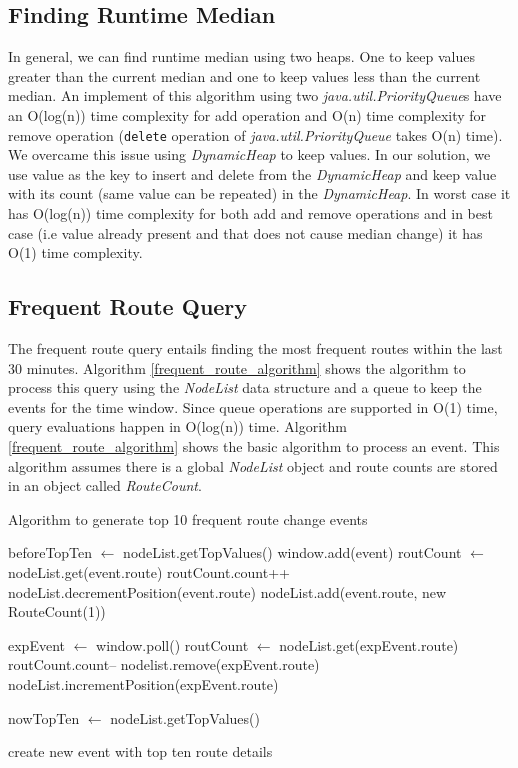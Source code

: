 \subsection{Finding Runtime Median}
In general, we can find runtime median using two heaps. One to keep values greater than the current median and one to keep values less than the current median. An implement of this algorithm using two \textit{java.util.PriorityQueue}s have an O(log(n)) time complexity for add operation and O(n) time complexity for remove operation (\texttt{delete} operation of \textit{java.util.PriorityQueue} takes O(n) time).  We overcame this issue using \textit{DynamicHeap} to keep values. In our solution, we use value as the key to insert and delete from the \textit{DynamicHeap} and keep value with its count (same value can be repeated) in the \textit{DynamicHeap}. In worst case it has O(log(n)) time complexity for both add and remove operations and in best case (i.e value already present and that does not cause median change) it has O(1) time complexity.

\subsection{Frequent Route Query}

The frequent route query entails finding the most frequent routes within the last 30 minutes. Algorithm \ref{frequent_route_algorithm} shows the algorithm to process this query using the \textit{NodeList} data structure and a queue to keep the events for the time window.  Since queue operations are supported in O(1) time, query evaluations happen in O(log(n)) time. Algorithm \ref{frequent_route_algorithm} shows the basic algorithm to process an event. This algorithm assumes there is a global \textit{NodeList} object and route counts are stored in an object called \textit{RouteCount}. 

\begin{algorithm}
\caption{Algorithm to generate top 10 frequent route change events}
\label{frequent_route_algorithm}
\begin{algorithmic}
\small 
\STATE beforeTopTen $\leftarrow$ nodeList.getTopValues() 
\STATE window.add(event) 
	\STATE routCount $\leftarrow$ nodeList.get(event.route) 
	\STATE routCount.count++ 
	\STATE nodeList.decrementPosition(event.route) 
\ELSE
	\STATE nodeList.add(event.route, new RouteCount(1)) 
\ENDIF

	\STATE  expEvent $\leftarrow$ window.poll() 
	\STATE  routCount $\leftarrow$ nodeList.get(expEvent.route)
	\STATE  routCount.count-- 
		\STATE nodelist.remove(expEvent.route)
	\ELSE
		\STATE nodeList.incrementPosition(expEvent.route) 
	\ENDIF
\ENDWHILE

\STATE nowTopTen $\leftarrow$ nodeList.getTopValues() 

	\STATE create new event with top ten route details 
\ENDIF

\end{algorithmic}
\end{algorithm}

